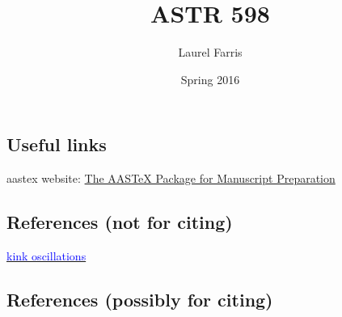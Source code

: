 \documentclass[12pt]{article}
\title{ASTR 598}
\author{Laurel Farris}
\date{Spring 2016}
\begin{document}
\maketitle

\subsection*{Useful links}

aastex website: \textcolor{blue}
{\href{http://aas.org/aastex/aastex-package-manuscript-preparation}
{The AASTeX Package for Manuscript Preparation}}

\subsection*{References (not for citing)}

\href{http://home.physics.ucla.edu/calendar/conferences/cmpd/talks/cowley.pdf}
{\textcolor{blue}{kink oscillations}}

\subsection*{References (possibly for citing)}
\end{document}
